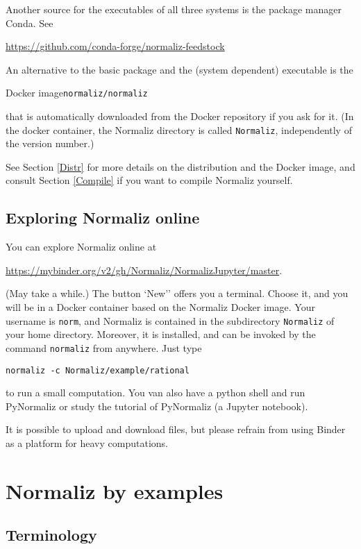 \documentclass[12pt,a4paper]{scrartcl}
\theoremstyle{definition}
\begin{document}
Another source for the executables of all three systems is the package manager Conda. See 
\begin{center}
	\url{https://github.com/conda-forge/normaliz-feedstock}
\end{center}


An alternative to the basic package and the (system dependent) executable is the  
\begin{center}
	Docker image\qquad \verb|normaliz/normaliz|
\end{center}
that is automatically downloaded from the Docker repository if you ask for it. (In the docker container, the Normaliz directory is called \verb|Normaliz|, independently of the version number.)

See Section \ref{Distr} for more details on the distribution and the Docker image, and consult Section \ref{Compile} if you want to compile Normaliz yourself. 

\subsection{Exploring Normaliz online}

You can explore Normaliz online at
\begin{center}
 \url{https://mybinder.org/v2/gh/Normaliz/NormalizJupyter/master}. 
\end{center}
(May take a while.) The button `New'' offers you a terminal. Choose it, and you will be in a Docker container based on the Normaliz Docker image. Your username is \verb|norm|, and Normaliz is contained in the subdirectory \verb|Normaliz| of your home directory. Moreover, it is installed, and can be invoked by the command \verb|normaliz| from anywhere. Just type
\begin{Verbatim}
normaliz -c Normaliz/example/rational
\end{Verbatim}
to run a small computation. You van also have a python shell and run PyNormaliz or study the tutorial of PyNormaliz (a Jupyter notebook).

It is possible to upload and download files, but please refrain from using Binder as a platform for heavy computations.



\section{Normaliz by examples}\label{Examples}

\subsection{Terminology}\label{Term}
\end{document}
